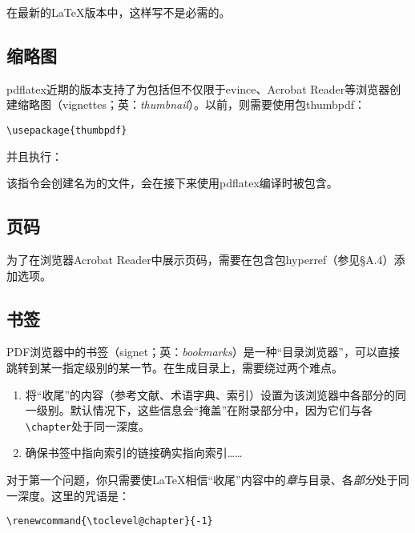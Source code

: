 在最新的\LaTeX 版本中，这样写不是必需的。

\subsection{缩略图}

\textsf{pdflatex}近期的版本支持了为包括但不仅限于\textsf{evince}、\textsf{Acrobat Reader}等浏览器创建缩略图（vignettes；英：\emph{thumbnail}）。以前，则需要使用包\textsf{thumbpdf}：

\begin{dmd}
\verb+\usepackage{thumbpdf}+
\end{dmd}

并且执行：


该指令会创建名为的文件，会在接下来使用\textsf{pdflatex}编译时被包含。

\subsection{页码}

为了在浏览器\textsf{Acrobat Reader}中展示页码，需要在包含包\textsf{hyperref}（参见\S A.4）添加选项。

\subsection{书签}

PDF浏览器中的书签（signet；英：\emph{bookmarks}）是一种“目录浏览器”，可以直接跳转到某一指定级别的某一节。在生成目录上，需要绕过两个难点。

\begin{enumerate}
    \item 将“收尾”的内容（参考文献、术语字典、索引）设置为该浏览器中各部分的同一级别。默认情况下，这些信息会“掩盖”在附录部分中，因为它们与各\verb|\chapter|处于同一深度。
    \item 确保书签中指向索引的链接确实指向索引……
\end{enumerate}

对于第一个问题，你只需要使\LaTeX 相信“收尾”内容中的\emph{章}与目录、各\emph{部分}处于同一深度。这里的咒语是：

\begin{dmd}
\verb|\renewcommand{\toclevel@chapter}{-1}|
\end{dmd}

